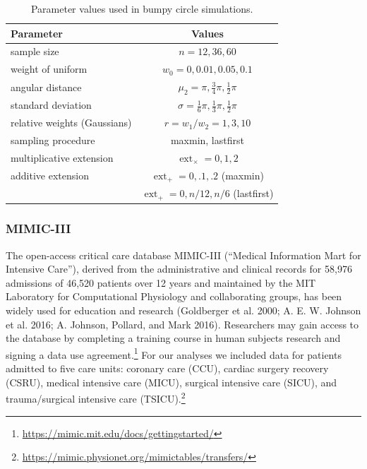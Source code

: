 \documentclass{article}
\begin{document}
\begin{table}\label{tab:bumpy-grid}
\centering
\begin{tabular}{|l|c|} \hline
Parameter & Values \\ \hline
sample size & $n = 12, 36, 60$ \\
weight of uniform & $w_0 = 0, 0.01, 0.05, 0.1$ \\
angular distance & $\mu_2 = \pi, \frac{3}{4}\pi, \frac{1}{2}\pi$ \\
standard deviation & $\sigma = \frac{1}{6}\pi, \frac{1}{3}\pi, \frac{1}{2}\pi$ \\
relative weights (Gaussians) & $r = w_1 / w_2 = 1, 3, 10$ \\
sampling procedure & maxmin, lastfirst \\
multiplicative extension & $\operatorname{ext}_\times = 0, 1, 2$ \\
additive extension & $\operatorname{ext}_+ = 0, .1, .2$ (maxmin) \\
 & $\operatorname{ext}_+ = 0, n / 12, n / 6$ (lastfirst) \\ \hline
\end{tabular}
\caption{Parameter values used in bumpy circle simulations.}
\end{table}

\hypertarget{mimic-iii}{%
\subsubsection{MIMIC-III}\label{mimic-iii}}

\label{sec:mimic}

The open-access critical care database MIMIC-III (``Medical Information
Mart for Intensive Care''), derived from the administrative and clinical
records for 58,976 admissions of 46,520 patients over 12 years and
maintained by the MIT Laboratory for Computational Physiology and
collaborating groups, has been widely used for education and research
(Goldberger et al. 2000; A. E. W. Johnson et al. 2016; A. Johnson,
Pollard, and Mark 2016). Researchers may gain access to the database by
completing a training course in human subjects research and signing a
data use agreement.\footnote{\url{https://mimic.mit.edu/docs/gettingstarted/}}
For our analyses we included data for patients admitted to five care
units: coronary care (CCU), cardiac surgery recovery (CSRU), medical
intensive care (MICU), surgical intensive care (SICU), and
trauma/surgical intensive care (TSICU).\footnote{\url{https://mimic.physionet.org/mimictables/transfers/}}
\end{document}
